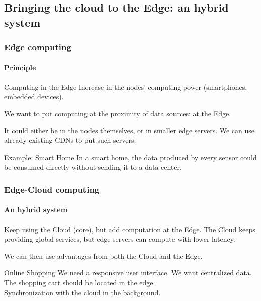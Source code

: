 \documentclass[utf8,xcolor=table, page number]{earlywinter}
\begin{document}
\subsection{Bringing the cloud to the Edge: an hybrid system} %
\begin{frame}
  \frametitle{Edge computing}
  \framesubtitle{Principle}

  \begin{block}{Computing in the Edge}
    Increase in the nodes' computing power (smartphones, embedded devices).
  \end{block}
   We want to put computing at the proximity of data sources: at the Edge.

   It could either be in the nodes themselves, or in smaller edge servers. We can use already existing CDNs to put such servers.
  
   \begin{exampleblock}{Example: Smart Home}
     In a smart home, the data produced by every sensor could be consumed directly without sending it to a data center.
   \end{exampleblock}

\end{frame}

\begin{frame}
  \frametitle{Edge-Cloud computing}
  \framesubtitle{An hybrid system}

%
  Keep using the Cloud (core), but add computation at the Edge.
  The Cloud keeps providing global services, but edge servers can compute with lower latency.

  We can then use advantages from both the Cloud and the Edge.
  
  \begin{exampleblock}{Online Shopping}
    We need a responsive user interface. We want centralized data.\\
    The shopping cart should be located in the edge.\\
    Synchronization with the cloud in the background.
  \end{exampleblock}
  
\end{frame}
\end{document}
